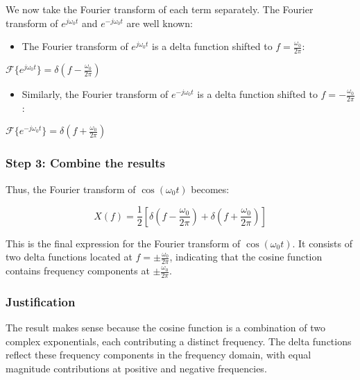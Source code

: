 \documentclass[11pt]{article}
\providecommand{\tightlist}{%
      \setlength{\itemsep}{0pt}\setlength{\parskip}{0pt}}
\begin{document}
We now take the Fourier transform of each term separately. The Fourier
transform of \(e^{j \omega_0 t}\) and \(e^{-j \omega_0 t}\) are well
known:

\begin{itemize}
\tightlist
\item
  The Fourier transform of \(e^{j \omega_0 t}\) is a delta function
  shifted to \(f = \frac{\omega_0}{2\pi}\):
\end{itemize}

\(\mathcal{F}\{e^{j \omega_0 t}\} = \delta\left(f - \frac{\omega_0}{2\pi}\right)\)

\begin{itemize}
\tightlist
\item
  Similarly, the Fourier transform of \(e^{-j \omega_0 t}\) is a delta
  function shifted to \(f = -\frac{\omega_0}{2\pi}\):
\end{itemize}

\(\mathcal{F}\{e^{-j \omega_0 t}\} = \delta\left(f + \frac{\omega_0}{2\pi}\right)\)

\subsubsection{Step 3: Combine the
results}\label{step-3-combine-the-results}

Thus, the Fourier transform of \(\cos(\omega_0 t)\) becomes:

\[
\boxed{
X(f) = \frac{1}{2} \left[ \delta\left(f - \frac{\omega_0}{2\pi}\right) + \delta\left(f + \frac{\omega_0}{2\pi}\right) \right]
}
\]

This is the final expression for the Fourier transform of
\(\cos(\omega_0 t)\). It consists of two delta functions located at
\(f = \pm \frac{\omega_0}{2\pi}\), indicating that the cosine function
contains frequency components at \(\pm \frac{\omega_0}{2\pi}\).

\subsubsection{Justification}\label{justification}

The result makes sense because the cosine function is a combination of
two complex exponentials, each contributing a distinct frequency. The
delta functions reflect these frequency components in the frequency
domain, with equal magnitude contributions at positive and negative
frequencies.
\end{document}
